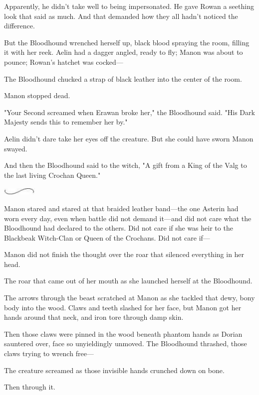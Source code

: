 Apparently, he didn't take well to being impersonated.
He gave Rowan a seething look that said as much.
And that demanded how they all hadn't noticed the difference.

But the Bloodhound wrenched herself up, black blood spraying the room, filling it with her reek.
Aelin had a dagger angled, ready to fly; Manon was about to pounce; Rowan's hatchet was cocked---

The Bloodhound chucked a strap of black leather into the center of the room.

Manon stopped dead.

"Your Second screamed when Erawan broke her," the Bloodhound said.
"His Dark Majesty sends this to remember her by."

Aelin didn't dare take her eyes off the creature.
But she could have sworn Manon swayed.

And then the Bloodhound said to the witch, "A gift from a King of the Valg  to the last living Crochan Queen."

\begin{center}
	\includegraphics[width=0.65in,height=0.13in]{images/seperator}
\end{center}

Manon stared and stared at that braided leather band---the one Asterin had worn every day, even when battle did not demand it---and did not care what the Bloodhound had declared to the others.
Did not care if she was heir to the Blackbeak Witch-Clan or Queen of the Crochans.
Did not care if---

Manon did not finish the thought over the roar that silenced everything in her head.

The roar that came out of her mouth as she launched herself at the Bloodhound.

The arrows through the beast scratched at Manon as she tackled that dewy, bony body into the wood.
Claws and teeth slashed for her face, but Manon got her hands around that neck, and iron tore through damp skin.

Then those claws were pinned in the wood beneath phantom hands as Dorian sauntered over, face so unyieldingly unmoved.
The Bloodhound thrashed, those claws trying to wrench free---

The creature screamed as those invisible hands crunched down on bone.

Then through it.

